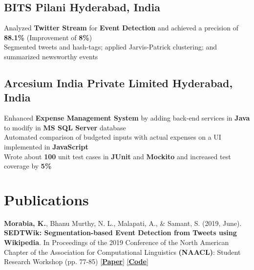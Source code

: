 \documentclass[]{Keval-resume}
\begin{document}
\subsection{BITS Pilani \hfill \normalfont H\lowercase{yderabad}, I\lowercase{ndia}}
\textbullet{} Analyzed \textbf{Twitter Stream} for \textbf{Event Detection} and achieved a precision of \textbf{88.1\%} (Improvement of \textbf{8\%})\\
\textbullet{} Segmented tweets and hash-tags; applied Jarvis-Patrick clustering; and summarized newsworthy events\\
\sectionsep

\subsection{Arcesium India Private Limited \hfill \normalfont H\lowercase{yderabad}, I\lowercase{ndia}}
\textbullet{} Enhanced \textbf{Expense Management System} by adding back-end services in \textbf{Java} to modify in \textbf{MS SQL Server} database \\
\textbullet{} Automated comparison of budgeted inputs with actual expenses on a UI implemented in \textbf{JavaScript} \\
\textbullet{} Wrote about \textbf{100} unit test cases in \textbf{JUnit} and \textbf{Mockito} and increased test coverage by \textbf{5\%}
\sectionsep


\section{Publications} 
\hrulefill
\postsectionsep 

\textbullet{} \textbf{Morabia, K.}, Bhanu Murthy, N. L., Malapati, A., \& Samant, S. (2019, June). \textbf{SEDTWik: Segmentation-based Event Detection from Tweets using Wikipedia}. In Proceedings of the 2019 Conference of the North American Chapter of the Association for Computational Linguistics \textbf{(NAACL)}: Student Research Workshop (pp. 77-85) \href{https://www.aclweb.org/anthology/papers/N/N19/N19-3011/}{[\textbf{Paper}]} \href{https://github.com/kevalmorabia97/SEDTWik-Event-Detection-from-Tweets}{[\textbf{Code}]}
\sectionsep
\end{document}
